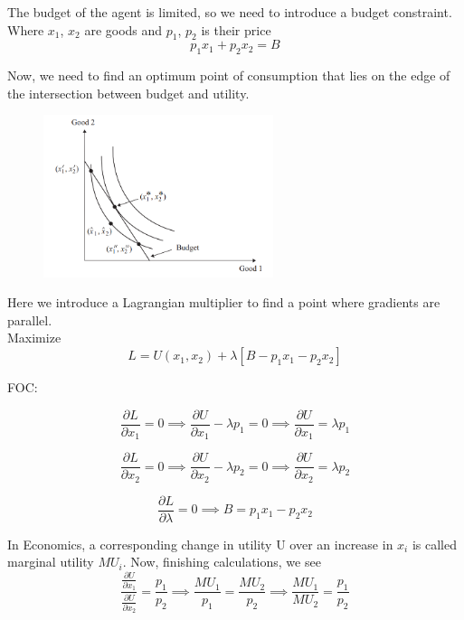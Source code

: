 \documentclass[]{article}
\begin{document}
The budget of the agent is limited, so we need to introduce a budget constraint. Where $x_1$, $x_2$ are goods and $p_1$, $p_2$ is their price    $$p_1x_1+p_2x_2=B$$

Now, we need to find an optimum point of consumption that lies on the edge of the intersection between budget and utility. 

\begin{figure}[h]
    \centering
    \includegraphics[width=0.60\textwidth]{indifference_curve.png}
\end{figure}

Here we introduce a Lagrangian multiplier to find a point where gradients are parallel. \\

 Maximize 
 $$L=U(x_1,x_2)+\lambda[B-p_1x_1-p_2x_2]$$

FOC:
   
  \begin{equation}
\frac{\partial L}{\partial x_1}=0 \implies \frac{\partial U}{\partial x_1}-\lambda p_1=0 \implies \frac{\partial U}{\partial x_1}=\lambda p_1
\end{equation}

  \begin{equation}
\frac{\partial L}{\partial x_2}=0 \implies \frac{\partial U}{\partial x_2}-\lambda p_2=0 \implies \frac{\partial U}{\partial x_2}=\lambda p_2
\end{equation}

\begin{equation}
\frac{\partial L}{\partial \lambda}=0 \implies B=p_1 x_1-p_2 x_2
\end{equation}

In Economics, a corresponding change in utility U over an increase in $x_i$ is called marginal utility $MU_i$. Now, finishing calculations, we see 
\begin{equation}
\frac{\frac{\partial U}{\partial x_1}}{\frac{\partial U}{\partial x_2}}=\frac{p_1}{p_2} \implies \frac{MU_1}{p_1}=\frac{MU_2}{p_2} \implies \frac{MU_1}{MU_2}=\frac{p_1}{p_2}
\end{equation}
\end{document}
